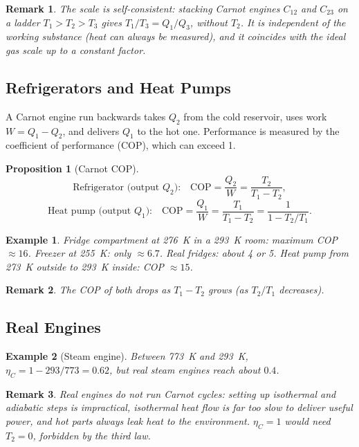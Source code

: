 \documentclass{article}
\newtheorem*{example}{Example}
\newtheorem{remark}{Remark}
\newtheorem{proposition}{Proposition}
\begin{document}
\begin{remark}
    The scale is self-consistent: stacking Carnot engines $C_{12}$ and $C_{23}$ on a ladder $T_1 > T_2 > T_3$ gives $T_1/T_3 = Q_1/Q_3$, without $T_2$. It is independent of the working substance (heat can always be measured), and it coincides with the ideal gas scale up to a constant factor.
\end{remark}

\subsection{Refrigerators and Heat Pumps}
A Carnot engine run backwards takes $Q_2$ from the cold reservoir, uses work $W = Q_1 - Q_2$, and delivers $Q_1$ to the hot one. Performance is measured by the coefficient of performance (COP), which can exceed 1.

\begin{proposition}[Carnot COP]
    \[\text{Refrigerator (output $Q_2$):} \quad \text{COP} = \frac{Q_2}{W} = \frac{T_2}{T_1 - T_2},\]
    \[\text{Heat pump (output $Q_1$):} \quad \text{COP} = \frac{Q_1}{W} = \frac{T_1}{T_1 - T_2} = \frac{1}{1 - T_2/T_1}.\]
\end{proposition}

\begin{example}
    Fridge compartment at \SI{276}{\kelvin} in a \SI{293}{\kelvin} room: maximum COP $\approx 16$. Freezer at \SI{255}{\kelvin}: only $\approx 6.7$. Real fridges: about 4 or 5. Heat pump from \SI{273}{\kelvin} outside to \SI{293}{\kelvin} inside: COP $\approx 15$.
\end{example}

\begin{remark}
    The COP of both drops as $T_1 - T_2$ grows (as $T_2/T_1$ decreases).
\end{remark}

\subsection{Real Engines}
\begin{example}[Steam engine]
    Between \SI{773}{\kelvin} and \SI{293}{\kelvin}, $\eta_C = 1 - 293/773 = 0.62$, but real steam engines reach about $0.4$.
\end{example}

\begin{remark}
    Real engines do not run Carnot cycles: setting up isothermal and adiabatic steps is impractical, isothermal heat flow is far too slow to deliver useful power, and hot parts always leak heat to the environment. $\eta_C = 1$ would need $T_2 = 0$, forbidden by the third law.
\end{remark}
\end{document}
